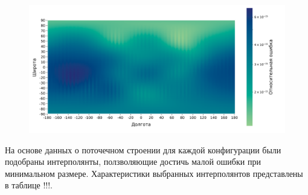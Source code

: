 \begin{figure}[h!]
    \centering
    \includegraphics[width=\linewidth]{../images/solution/atmo/2753_latlon_abs_error_heatmap.png}
    \label{fig:atmo:2753_latlon_abs_err}
 \end{figure}

 На основе данных о поточечном строении для каждой конфигурации были подобраны интерполянты, 
 ползволяющие достичь малой ошибки при минимальном размере. 
 Характеристики выбранных интерполянтов представлены в таблице !!!.

\clearpage